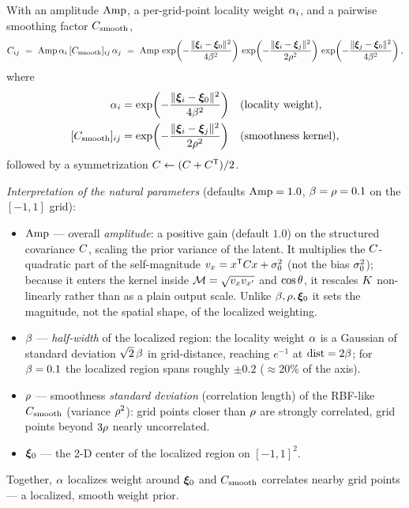 \begin{definition}
With an amplitude $\mathrm{Amp}$, a per-grid-point locality weight $\alpha_i$, and a pairwise
smoothing factor $C_{\mathrm{smooth}}$,
\begin{equation}
\Cmat_{ij}
\ =\ \Amp\,\loc_i\,[\Csm]_{ij}\,\loc_j
\ =\ \Amp\,\exp\!\left(-\frac{\lVert\pixc_i-\rfc\rVert^2}{4\bwid^2}\right)\,
      \exp\!\left(-\frac{\lVert\pixc_i-\pixc_j\rVert^2}{2\smoo^2}\right)\,
      \exp\!\left(-\frac{\lVert\pixc_j-\rfc\rVert^2}{4\bwid^2}\right),
\label{eq:Cprior}
\end{equation}
where
\begin{equation}
\begin{aligned}
\loc_i&=\exp\!\left(-\frac{\lVert\pixc_i-\rfc\rVert^2}{4\bwid^2}\right)
&&\text{(locality weight)},\\
[\Csm]_{ij}&=\exp\!\left(-\frac{\lVert\pixc_i-\pixc_j\rVert^2}{2\smoo^2}\right)
&&\text{(smoothness kernel)},
\end{aligned}
\end{equation}
followed by a symmetrization $C\leftarrow(C+C^{\mathsf{T}})/2$.
\end{definition}

\emph{Interpretation of the natural parameters} (defaults $\mathrm{Amp}=1.0$,
$\beta=\rho=0.1$ on the $[-1,1]$ grid):
\begin{itemize}[leftmargin=1.4em]
\item $\mathrm{Amp}$ --- overall \emph{amplitude}: a positive gain (default $1.0$) on the
  structured covariance $C$, scaling the prior variance of the latent. It
  multiplies the $C$-quadratic part of the self-magnitude
  $v_x=x^{\mathsf{T}}C x+\sigma_{0}^2$ (not the bias $\sigma_{0}^2$); because it enters
  the kernel inside $\mathcal{M}=\sqrt{v_xv_{x'}}$ and $\cos\theta$, it rescales
  $K$ non-linearly rather than as a plain output scale. Unlike $\beta,\rho,\bm{\xi}_{0}$
  it sets the magnitude, not the spatial shape, of the localized weighting.
\item $\beta$ --- \emph{half-width} of the localized region: the locality weight
  $\alpha$ is a Gaussian of standard deviation $\sqrt{2}\,\beta$ in grid-distance,
  reaching $e^{-1}$ at $\text{dist}=2\beta$; for $\beta=0.1$ the localized region
  spans roughly $\pm0.2$ ($\approx20\%$ of the axis).
\item $\rho$ --- smoothness \emph{standard deviation} (correlation length) of the
  RBF-like $C_{\mathrm{smooth}}$ (variance $\rho^2$): grid points closer than $\rho$ are
  strongly correlated, grid points beyond $3\rho$ nearly uncorrelated.
\item $\bm{\xi}_{0}$ --- the 2-D center of the localized region on $[-1,1]^2$.
\end{itemize}
Together, $\alpha$ localizes weight around $\bm{\xi}_{0}$ and $C_{\mathrm{smooth}}$ correlates nearby grid
points --- a localized, smooth weight prior.

